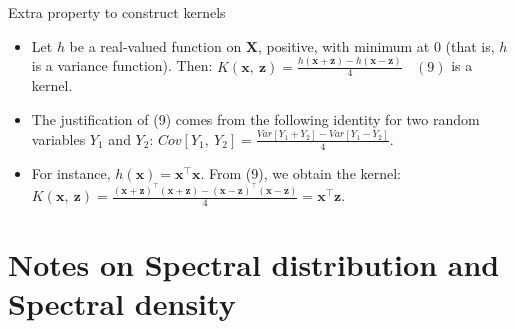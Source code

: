 \documentclass[
  ignorenonframetext,
]{beamer}
\begin{document}
\begin{frame}{Extra property to construct kernels}
\protect\hypertarget{extra-property-to-construct-kernels}{}
\begin{itemize}
\item
  Let \(h\) be a real-valued function on \(\pmb X\), positive, with
  minimum at \(0\) (that is, \(h\) is a variance function). Then:
  \(K(\pmb x,\ \pmb z) = \frac {h(\pmb x + \pmb z) - h(\pmb x - \pmb z)} 4 \ \ \ \ (9)\)
  is a kernel.
\item
  The justification of (9) comes from the following identity for two
  random variables \(Y_1\) and \(Y_2\):
  \(Cov[Y_1,\ Y_2] = \frac {Var[Y_1 + Y_2] - Var[Y_1 - Y_2]} 4\).
\item
  For instance, \(h(\pmb x) = \pmb x^{\top} \pmb x\). From (9), we
  obtain the kernel:
  \(K(\pmb x,\ \pmb z) = \frac {(\pmb x + \pmb z)^{\top} (\pmb x + \pmb z) - (\pmb x - \pmb z)^{\top} (\pmb x - \pmb z)} 4 = \pmb x^{\top} \pmb z\).
\end{itemize}
\end{frame}

\hypertarget{notes-on-spectral-distribution-and-spectral-density}{%
\section{Notes on Spectral distribution and Spectral
density}\label{notes-on-spectral-distribution-and-spectral-density}}
\end{document}
